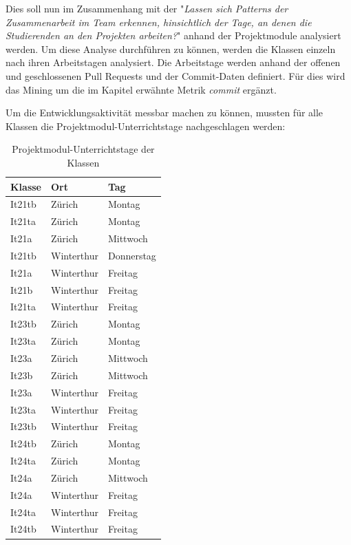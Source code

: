 Dies soll nun im Zusammenhang mit der  "\textit{Lassen sich Patterns der Zusammenarbeit im Team erkennen,
hinsichtlich der Tage, an denen die Studierenden an den Projekten arbeiten?}" anhand der Projektmodule analysiert werden. Um diese Analyse durchführen zu können, werden die Klassen einzeln nach ihren Arbeitstagen analysiert. Die Arbeitstage werden anhand der offenen und geschlossenen Pull Requests und der Commit-Daten definiert. Für dies wird das Mining um die im Kapitel  erwähnte Metrik \textit{commit} ergänzt.

Um die Entwicklungsaktivität messbar machen zu können, mussten für alle Klassen die Projektmodul-Unterrichtstage nachgeschlagen werden:
\begin{table}[ht]
\caption{Projektmodul-Unterrichtstage der Klassen}
\label{tab:stundenplan}
\centering
\begin{tabular}{l l l}
\toprule
\textbf{Klasse} & \textbf{Ort} & \textbf{Tag} \\
\midrule
It21tb   & Zürich      & Montag      \\
It21ta   & Zürich      & Montag      \\
It21a    & Zürich      & Mittwoch    \\
It21tb   & Winterthur  & Donnerstag  \\
It21a    & Winterthur  & Freitag     \\
It21b    & Winterthur  & Freitag     \\
It21ta   & Winterthur  & Freitag     \\
\midrule
It23tb   & Zürich      & Montag      \\
It23ta   & Zürich      & Montag      \\
It23a    & Zürich      & Mittwoch    \\
It23b    & Zürich      & Mittwoch    \\
It23a    & Winterthur  & Freitag     \\
It23ta   & Winterthur  & Freitag     \\
It23tb   & Winterthur  & Freitag     \\
\midrule
It24tb   & Zürich      & Montag      \\
It24ta   & Zürich      & Montag      \\
It24a    & Zürich      & Mittwoch    \\
It24a    & Winterthur  & Freitag     \\
It24ta   & Winterthur  & Freitag     \\
It24tb   & Winterthur  & Freitag     \\
\bottomrule
\end{tabular}
\end{table}



